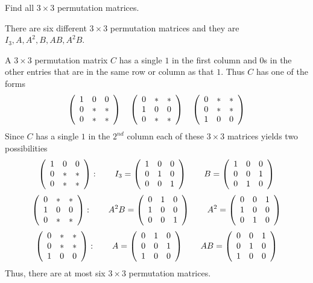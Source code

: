 \documentclass{ximera}
\begin{document}
\begin{exercise} \label{YZ_3.5_Permu6}
Find all $3\times 3$ permutation matrices.

\begin{solution}
\ans 
There are six different $3\times 3$ permutation matrices and they are $I_3, A, A^2, B, AB, A^2B$.

\soln 
A $3\times 3$ permutation matrix $C$ has a single $1$ in the first column and $0$s in the other entries that are in the same row or column as that $1$. Thus $C$ has one of the forms
\[
\left(\begin{array}{rrrrrrrrrrrrrrrrrr} 1 & 0 & 0\\ 0 & * & *\\0 & * & * \end{array}\right) \quad \left(\begin{array}{rrrrrrrrrrrrrrrrrr} 0 & * & *\\ 1 & 0 & 0\\ 0 & * & * \end{array}\right)
 \quad \left(\begin{array}{rrrrrrrrrrrrrrrrrr} 0 & * & *\\ 0 & * & *\\ 1 & 0 & 0 \end{array}\right)
\]
Since $C$ has a single $1$ in the $2^{nd}$ column each of these $3\times 3$ matrices yields two possibilities
\[
\left(\begin{array}{rrrrrrrrrrrrrrrrrr} 1 & 0 & 0\\ 0 & * & *\\0 & * & * \end{array}\right): \qquad I_3 = \left(\begin{array}{rrrrrrrrrrrrrrrrrr} 1 & 0 & 0\\ 0 & 1 & 0\\0 & 0 & 1 \end{array}\right) \qquad B = \left(\begin{array}{rrrrrrrrrrrrrrrrrr} 1 & 0 & 0\\ 0 & 0 & 1 \\0 & 1 & 0 \end{array}\right)
\]
\[
\left(\begin{array}{rrrrrrrrrrrrrrrrrr} 0 & * & *\\ 1 & 0 & 0\\ 0 & * & * \end{array}\right): \qquad A^2B = \left(\begin{array}{rrrrrrrrrrrrrrrrrr} 0 & 1 & 0\\ 1 & 0 & 0\\ 0 & 0 & 1 \end{array}\right) \qquad A^2 = \left(\begin{array}{rrrrrrrrrrrrrrrrrr} 0 & 0 & 1\\ 1 & 0 & 0\\ 0 & 1 & 0 \end{array}\right)
\]
\[
\left(\begin{array}{rrrrrrrrrrrrrrrrrr} 0 & * & *\\ 0 & * & *\\ 1 & 0 & 0 \end{array}\right): \qquad A = \left(\begin{array}{rrrrrrrrrrrrrrrrrr} 0 & 1 & 0 \\ 0 & 0  & 1 \\ 1 & 0 & 0 \end{array}\right) \qquad AB = \left(\begin{array}{rrrrrrrrrrrrrrrrrr} 0 & 0 & 1 \\ 0 & 1 & 0 \\ 1 & 0 & 0 \end{array}\right)
\]
Thus, there are at most six $3\times 3$ permutation matrices.

\end{solution}
\end{exercise}
\end{document}
